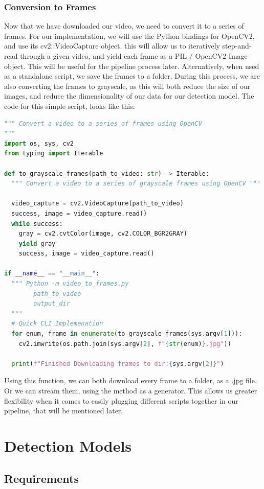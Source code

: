 \documentclass{article}
\begin{document}
\subsubsection{Conversion to Frames}
Now that we have downloaded our video, we need to convert it to a series of frames. 
For our implementation, we will use the Python bindings for OpenCV2, and use its cv2::VideoCapture object.
this will allow us to iteratively step-and-read through a given video, and yield each frame
as a PIL / OpenCV2 Image object.  This will be useful for the pipeline process later. 
Alternatively, when used as a standalone script, we save the frames to a folder.
\newline\newline
During this process, we are also converting the frames to grayscale, as this
will both reduce the size of our images, and reduce the dimensionality of our data
for our detection model. The code for this simple script, looks like this:
\begin{lstlisting}[language=python]
""" Convert a video to a series of frames using OpenCV
"""
import os, sys, cv2
from typing import Iterable

def to_grayscale_frames(path_to_video: str) -> Iterable:
  """ Convert a video to a series of grayscale frames using OpenCV """
  
  video_capture = cv2.VideoCapture(path_to_video)
  success, image = video_capture.read()
  while success:
    gray = cv2.cvtColor(image, cv2.COLOR_BGR2GRAY)
    yield gray
    success, image = video_capture.read()

if __name__ == "__main__":
  """ Python -m video_to_frames.py
        path_to_video
        output_dir
  """
  # Quick CLI Implemenation
  for enum, frame in enumerate(to_grayscale_frames(sys.argv[1])):
    cv2.imwrite(os.path.join(sys.argv[2], f"{str(enum)}.jpg"))

  print(f"Finished Downloading frames to dir:{sys.argv[2]}")
\end{lstlisting}
Using this function, we can both download every frame to a folder, as a .jpg file. Or we can
stream them, using the method as a generator. This allows us greater flexibility when it comes to easily 
plugging different scripts together in our pipeline, that will be mentioned later.

\section{Detection Models}
\subsection{Requirements}
\end{document}

